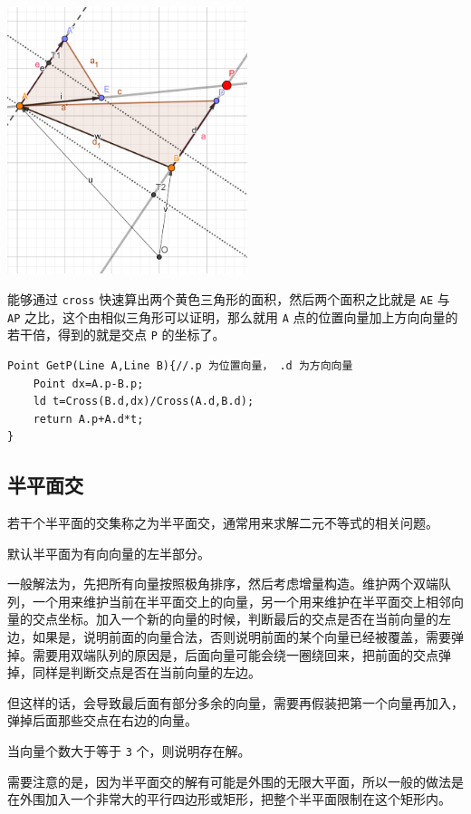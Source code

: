 \documentclass[UTF-8]{ctexart}
\begin{document}
	\begin{center}
		\includegraphics[width=7cm]{file//point.png}
	\end{center}

	能够通过 \texttt{cross} 快速算出两个黄色三角形的面积，然后两个面积之比就是 \texttt{AE} 与 \texttt{AP} 之比，这个由相似三角形可以证明，那么就用 \texttt{A} 点的位置向量加上方向向量的若干倍，得到的就是交点 \texttt{P} 的坐标了。
\begin{verbatim}
Point GetP(Line A,Line B){//.p 为位置向量， .d 为方向向量
    Point dx=A.p-B.p;
    ld t=Cross(B.d,dx)/Cross(A.d,B.d);
    return A.p+A.d*t;
}
\end{verbatim}
	
	\subsection{半平面交}
	若干个半平面的交集称之为半平面交，通常用来求解二元不等式的相关问题。  
	
	默认半平面为有向向量的左半部分。
	
	一般解法为，先把所有向量按照极角排序，然后考虑增量构造。维护两个双端队列，一个用来维护当前在半平面交上的向量，另一个用来维护在半平面交上相邻向量的交点坐标。加入一个新的向量的时候，判断最后的交点是否在当前向量的左边，如果是，说明前面的向量合法，否则说明前面的某个向量已经被覆盖，需要弹掉。需要用双端队列的原因是，后面向量可能会绕一圈绕回来，把前面的交点弹掉，同样是判断交点是否在当前向量的左边。  
	
	但这样的话，会导致最后面有部分多余的向量，需要再假装把第一个向量再加入，弹掉后面那些交点在右边的向量。  
	
	当向量个数大于等于 \texttt{3} 个，则说明存在解。
	
	需要注意的是，因为半平面交的解有可能是外围的无限大平面，所以一般的做法是在外围加入一个非常大的平行四边形或矩形，把整个半平面限制在这个矩形内。
	
\end{document}
